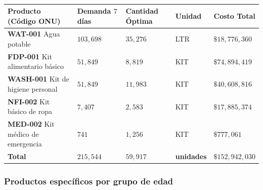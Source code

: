 \documentclass[
  spanish,
  us-letterpaper,
]{scrreprt}
\numberwithin{equation}{section}
\begin{document}
\begin{longtable}[]{@{}
  >{\centering\arraybackslash}p{}
  >{\centering\arraybackslash}p{}
  >{\centering\arraybackslash}p{}
  >{\centering\arraybackslash}p{}
  >{\centering\arraybackslash}p{}@{}}

\caption{\label{tbl-inventario-basico}}

\tabularnewline

\toprule\noalign{}
\begin{minipage}[b]{\linewidth}\centering
\textbf{Producto (Código ONU)}
\end{minipage} & \begin{minipage}[b]{\linewidth}\centering
\textbf{Demanda \(7\) días}
\end{minipage} & \begin{minipage}[b]{\linewidth}\centering
\textbf{Cantidad Óptima}
\end{minipage} & \begin{minipage}[b]{\linewidth}\centering
\textbf{Unidad}
\end{minipage} & \begin{minipage}[b]{\linewidth}\centering
\textbf{Costo Total}
\end{minipage} \\
\midrule\noalign{}
\endhead
\bottomrule\noalign{}
\endlastfoot
\textbf{WAT-001} Agua potable & \(103,698\) & \(35,276\) & LTR &
\(\$18,776,360\) \\
\textbf{FDP-001} Kit alimentario básico & \(51,849\) & \(8,819\) & KIT &
\(\$74,894,419\) \\
\textbf{WASH-001} Kit de higiene personal & \(51,849\) & \(11,983\) &
KIT & \(\$40,608,816\) \\
\textbf{NFI-002} Kit básico de ropa & \(7,407\) & \(2,583\) & KIT &
\(\$17,885,374\) \\
\textbf{MED-002} Kit médico de emergencia & \(741\) & \(1,256\) & KIT &
\(\$777,061\) \\
\textbf{Total} & \textbf{\(215,544\)} & \textbf{\(59,917\)} &
\textbf{unidades} & \textbf{\(\$152,942,030\)} \\

\end{longtable}

\subsubsection{Productos específicos por grupo de
edad}\label{productos-especuxedficos-por-grupo-de-edad}
\end{document}
